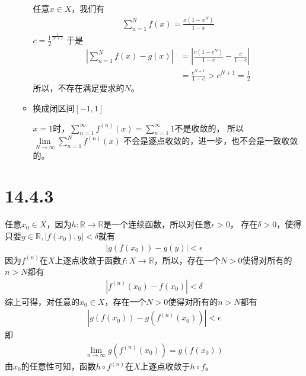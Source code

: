 \documentclass{article}
\begin{document}
\begin{itemize}
\begin{itemize}
                任意$x \in X$，我们有
                \begin{align*}
                  \sum\limits_{n = 1}^N  f(x) = \frac{x(1 - x^N)}{1 - x}
                \end{align*}
                $c = \frac{1}{2}^{\frac{1}{N + 1}}$
                于是
                \begin{align*}
                  |\sum\limits_{n = 1}^N  f(x) - g(x)| & = |\frac{c(1 - c^N)}{1 - c} - \frac{c}{1 - c}|    \\
                                                       & = \frac{c^{N + 1}}{1 - c} > c^{N+1} = \frac{1}{2}
                \end{align*}
                所以，不存在满足要求的$N$。

          \item 换成闭区间$[-1, 1]$

                $x = 1$时，$\sum\limits_{n = 1}^\infty  f^{(n)}(x) = \sum\limits_{n = 1}^\infty  1$不是收敛的，
                所以$\lim\limits_{N \to \infty}\sum\limits_{n = 1}^N  f^{(n)}(x)$
                不会是逐点收敛的，进一步，也不会是一致收敛的。

        \end{itemize}


\end{itemize}

\section*{14.4.3}

任意$x_0 \in X$，因为$h: \mathbb{R} \to \mathbb{R}$是一个连续函数，所以对任意$\epsilon > 0$，
存在$\delta > 0$，使得只要$y \in \mathbb{R}, |f(x_0), y| < \delta$就有
\begin{align*}
    |g(f(x_0)) - g(y)| < \epsilon
\end{align*}
因为$f^{(n)}$在$X$上逐点收敛于函数$f: X \to \mathbb{R}$，所以，存在一个$N > 0$使得对所有的$n > N$都有
\begin{align*}
  |f^{(n)}(x_0) - f(x_0)| < \delta
\end{align*}
综上可得，对任意的$x_0 \in X$，存在一个$N > 0$使得对所有的$n > N$都有
\begin{align*}
  |g(f(x_0)) - g(f^{(n)}(x_0))| < \epsilon
\end{align*}
即
\begin{align*}
  \lim \limits_{n \to \infty} g(f^{(n)}(x_0)) = g(f(x_0))
\end{align*}
由$x_0$的任意性可知，函数$h \circ f^{(n)}$在$X$上逐点收敛于$h \circ f$。
\end{document}
